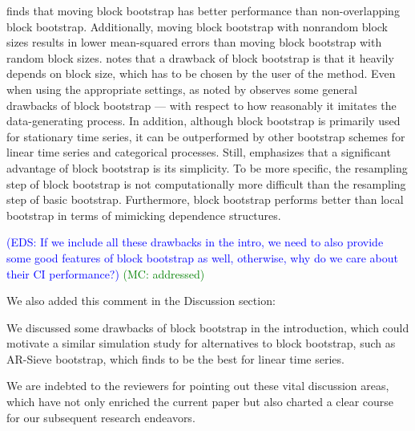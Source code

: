 \documentclass[12pt]{article}
\newcommand{\eds}[1]{\textcolor{blue}{(EDS: #1)}}
\newcommand{\mc}[1]{\textcolor{green}{(MC: #1)}}
\begin{document}
\citet{lahiri1999theoretical} finds that moving block bootstrap has better 
performance than non-overlapping block bootstrap. Additionally, moving block 
bootstrap with nonrandom
block sizes results in lower mean-squared errors than moving block bootstrap
with random block sizes. \citet{buhlmann1999block} notes that a drawback of 
block bootstrap is that it heavily depends on block size, which has to be chosen
by the user of the method.
Even when using the appropriate settings, as noted by
\citet{buhlmann2002bootstraps} observes some general drawbacks of block 
bootstrap --- with respect to how reasonably it imitates the data-generating 
process. In addition, although block bootstrap is primarily used for stationary 
time series, it can be outperformed by other bootstrap schemes for linear time
series and categorical processes. Still, \citet{buhlmann2002bootstraps}
emphasizes that a significant advantage of block bootstrap is its simplicity.
To be more specific, the resampling step of block bootstrap is not 
computationally more difficult than the resampling step of basic bootstrap.
Furthermore, block bootstrap performs better than local bootstrap in terms of
mimicking dependence structures.

\eds{If we include all these drawbacks in the intro, we need to also provide 
some good features of block bootstrap as well, otherwise, why do we care about 
their CI performance?}
\mc{addressed}

We also added this comment in the Discussion section:

We discussed some
drawbacks of block bootstrap in the introduction, which could motivate a similar
simulation study for alternatives to block bootstrap, such 
as AR-Sieve bootstrap, \citep{kreiss1992bootstrap} which 
\citet{buhlmann2002bootstraps} finds to be the best for linear time series. 

We are indebted to the reviewers for pointing out these vital discussion areas,
which have not only enriched the current paper but also charted a clear course
for our subsequent research endeavors.




\end{document}
